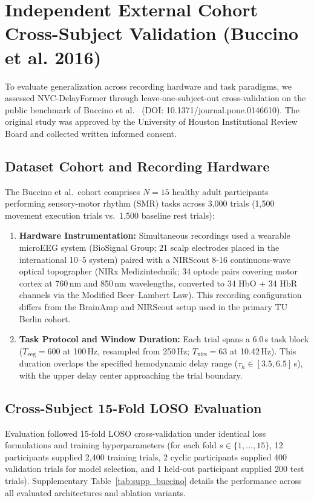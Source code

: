 \documentclass[journal]{IEEEtran}
\begin{document}
\section{Independent External Cohort Cross-Subject Validation (Buccino et al. 2016)}
\label{sec:supp_buccino}

To evaluate generalization across recording hardware and task paradigms, we assessed NVC-DelayFormer through leave-one-subject-out cross-validation on the public benchmark of Buccino et al.\ \cite{buccino2016hybrid} (DOI: 10.1371/journal.pone.0146610). The original study was approved by the University of Houston Institutional Review Board and collected written informed consent.

\subsection{Dataset Cohort and Recording Hardware}
The Buccino et al.\ cohort comprises $N=15$ healthy adult participants performing sensory-motor rhythm (SMR) tasks across 3,000 trials (1,500 movement execution trials vs.\ 1,500 baseline rest trials):
\begin{enumerate}
    \item \textbf{Hardware Instrumentation:} Simultaneous recordings used a wearable microEEG system (BioSignal Group; 21 scalp electrodes placed in the international 10--5 system) paired with a NIRScout 8-16 continuous-wave optical topographer (NIRx Medizintechnik; 34 optode pairs covering motor cortex at 760\,nm and 850\,nm wavelengths, converted to 34 HbO + 34 HbR channels via the Modified Beer--Lambert Law). This recording configuration differs from the BrainAmp and NIRScout setup used in the primary TU Berlin cohort.
    \item \textbf{Task Protocol and Window Duration:} Each trial spans a 6.0\,s task block ($T_{\mathrm{eeg}} = 600$ at 100\,Hz, resampled from 250\,Hz; $T_{\mathrm{nirs}} = 63$ at 10.42\,Hz). This duration overlaps the specified hemodynamic delay range ($\tau_h \in [3.5, 6.5]$\,s), with the upper delay center approaching the trial boundary.
\end{enumerate}

\subsection{Cross-Subject 15-Fold LOSO Evaluation}
Evaluation followed 15-fold LOSO cross-validation under identical loss formulations and training hyperparameters (for each fold $s \in \{1,\dots,15\}$, 12 participants supplied 2,400 training trials, 2 cyclic participants supplied 400 validation trials for model selection, and 1 held-out participant supplied 200 test trials). Supplementary Table~\ref{tab:supp_buccino} details the performance across all evaluated architectures and ablation variants.
\end{document}
